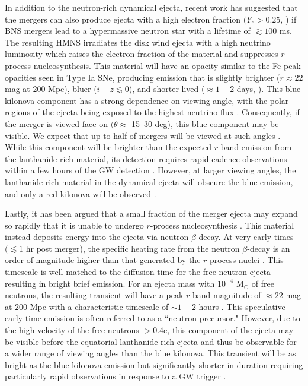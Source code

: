 In addition to the neutron-rich dynamical ejecta, recent work has suggested that the mergers can also produce ejecta with a high electron fraction $(Y_e > 0.25$,  \citealt{Wanajo+14,Goriely+15}) if BNS mergers lead to a hypermassive neutron star \citep[HMNS; see e.g.,][]{Sekiguchi+11} with a lifetime of $\gtrsim 100$ ms. The resulting HMNS irradiates the disk wind ejecta with a high neutrino luminosity which raises the electron fraction of the material and suppresses $r$-process nucleosynthesis. This material will have an opacity similar to the Fe-peak opacities seen in Type Ia SNe, producing emission that is slightly brighter ($r \approx 22$ mag at 200 Mpc), bluer ($i-z \lesssim 0$), and shorter-lived ($\approx 1-2$ days, \citealt{MetzgerFernandez14,Kasen+15}). This blue kilonova component has a strong dependence on viewing angle, with the polar regions of the ejecta being exposed to the highest neutrino flux \citep{MetzgerFernandez14,Kasen+15}. Consequently, if the merger is viewed face-on $(\theta \approx$ 15--30 deg), this blue component may be visible. We expect that up to half of mergers will be viewed at such angles \citep[see e.g.,][]{MetzgerBerger12}. While this component will be brighter than the expected $r$-band emission from the lanthanide-rich material, its detection requires rapid-cadence observations within a few hours of the GW detection \citep{CowpBerger15}. However, at larger viewing angles, the lanthanide-rich material in the dynamical ejecta will obscure the blue emission, and only a red kilonova will be observed \citep{Kasen+15,Metzger2017}.

Lastly, it has been argued that a small fraction of the merger ejecta may expand so rapidly that it is unable to undergo $r$-process nucleosynthesis \citep{Bauswein+13a}. This material instead deposits energy into the ejecta via neutron $\beta$-decay. At very early times $(\lesssim 1$ hr post merger), the specific heating rate from the neutron $\beta$-decay is an order of magnitude higher than that generated by the $r$-process nuclei \citep{Metzger2017}. This timescale is well matched to the diffusion time for the free neutron ejecta resulting in bright brief emission. For an ejecta mass with $10^{-4}$ M$_{\odot}$ of free neutrons, the resulting transient will have a peak $r$-band magnitude of $\approx 22$ mag at 200 Mpc with a characteristic timescale of $\sim 1-2$ hours \citep{Metzger+15}. This speculative early time emission is often referred to as a ``neutron precursor." However, due to the high velocity of the free neutrons $>0.4$c, this component of the ejecta may be visible before the equatorial lanthanide-rich ejecta and thus be observable for a wider range of viewing angles than the blue kilonova. This transient will be as bright as the blue kilonova emission but significantly shorter in duration requiring particularly rapid observations in response to a GW trigger \citep{CowpBerger15}.


